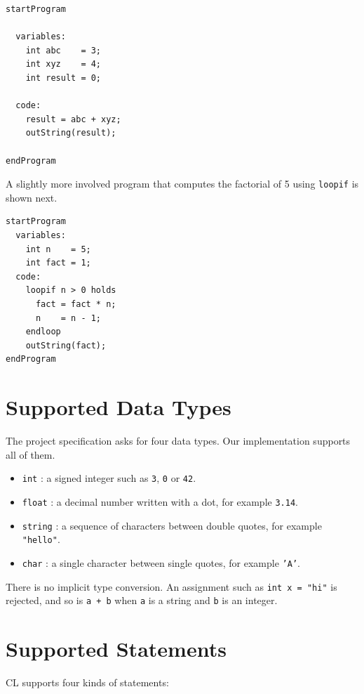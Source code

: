 \documentclass[12pt,a4paper]{report}
\begin{document}
\begin{verbatim}
startProgram

  variables:
    int abc    = 3;
    int xyz    = 4;
    int result = 0;

  code:
    result = abc + xyz;
    outString(result);

endProgram
\end{verbatim}

A slightly more involved program that computes the factorial of 5 using \texttt{loopif} is shown next.

\begin{verbatim}
startProgram
  variables:
    int n    = 5;
    int fact = 1;
  code:
    loopif n > 0 holds
      fact = fact * n;
      n    = n - 1;
    endloop
    outString(fact);
endProgram
\end{verbatim}

\section{Supported Data Types}

The project specification asks for four data types. Our implementation supports all of them.

\begin{itemize}
\item \texttt{int} : a signed integer such as \texttt{3}, \texttt{0} or \texttt{42}.
\item \texttt{float} : a decimal number written with a dot, for example \texttt{3.14}.
\item \texttt{string} : a sequence of characters between double quotes, for example \texttt{"hello"}.
\item \texttt{char} : a single character between single quotes, for example \texttt{'A'}.
\end{itemize}

There is no implicit type conversion. An assignment such as \texttt{int x = "hi"} is rejected, and so is \texttt{a + b} when \texttt{a} is a string and \texttt{b} is an integer.

\section{Supported Statements}

CL supports four kinds of statements:
\end{document}
